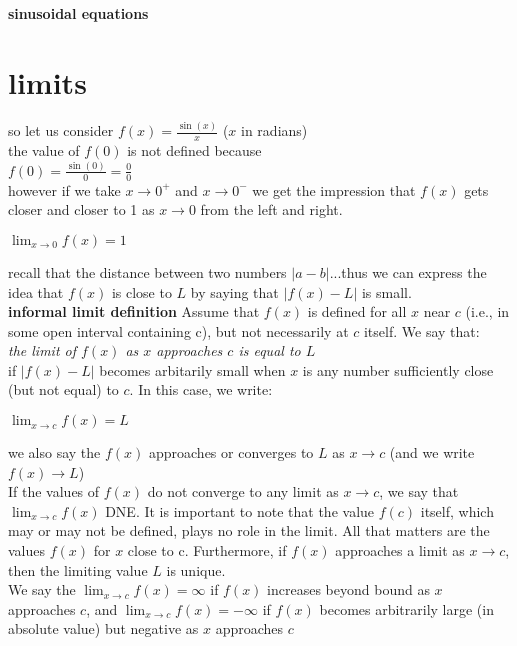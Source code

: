 \documentclass{article}
\begin{document}
\textbf{sinusoidal equations}


\newpage
\section*{limits}
	so let us consider $f(x) = \frac{\sin(x)}{x}$ ($x$ in radians)\\
	the value of $f(0)$ is not defined because\\
	$f(0) = \frac{\sin(0)}{0} = \frac{0}{0}$\\
	however if we take $x \to 0^{+}$ and $x \to 0^{-}$ we get the impression that $f(x)$ gets closer and closer to 1 as $x \to 0$ from the left and right.
	\begin{center}
		$\lim_{x \to 0}f(x) = 1$
	\end{center}
	recall that the distance between two numbers $\lvert a - b\rvert$...thus we can express the idea that $f(x)$ is close to $L$ by saying that $\lvert f(x) - L\rvert$ is small.\\

	\textbf{informal limit definition} Assume that $f(x)$ is defined for all $x$ near $c$ (i.e., in some open interval containing c), but not necessarily at $c$ itself. We say that:\\
	\textit{the limit of $f(x)$ as $x$ approaches $c$ is equal to $L$}\\
	if $\lvert f(x) - L\rvert$ becomes arbitarily small when $x$ is any number sufficiently close (but not equal) to $c$. In this case, we write:
	\begin{center}
		$\lim_{x \to c}f(x) = L$
	\end{center}
	we also say the $f(x)$ approaches or converges to $L$ as $x \to c$ (and we write $f(x) \to L$)\\

	If the values of $f(x)$ do not converge to any limit as $x \to c$, we say that $\lim_{x \to c}f(x)$ DNE. It is important to note that the value $f(c)$ itself, which may or may not be defined, plays no role in the limit. All that matters are the values $f(x)$ for $x$ close to c. Furthermore, if $f(x)$ approaches a limit as $x \to c$, then the limiting value $L$ is unique.\\

	We say the $\lim_{x \to c}f(x) = \infty$ if $f(x)$ increases beyond bound as $x$ approaches $c$, and $\lim_{x \to c}f(x) = -\infty$ if $f(x)$ becomes arbitrarily large (in absolute value) but negative as $x$ approaches $c$\\
\end{document}
